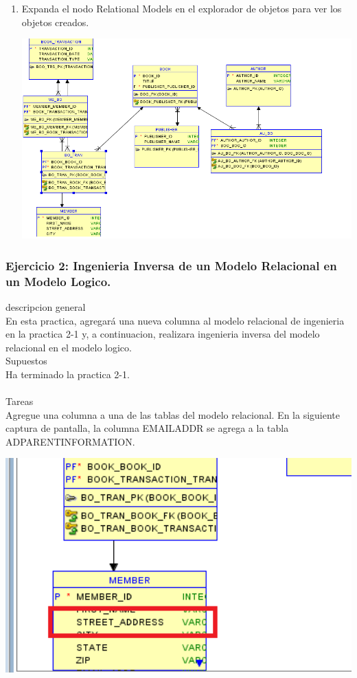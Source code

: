 \documentclass[12pt,letterpaper]{article}
\begin{document}
\begin{enumerate}[1.]
     \item Expanda el nodo Relational Models en el explorador de objetos para ver los objetos creados.
     
          \includegraphics[width=15cm]{./soniaImagen/diagrama5.png}  
          
		\end{enumerate}



\subsubsection{Ejercicio 2: Ingenieria Inversa de un Modelo Relacional en un Modelo Logico.} 
descripcion general  \\
En esta practica, agregará una nueva columna al modelo relacional de ingenieria en la practica 2-1 y, a continuacion, realizara ingenieria inversa del modelo relacional en el modelo logico. \\
Supuestos\\
Ha terminado la practica 2-1.\\
\\
Tareas\\
Agregue una columna a una de las tablas del modelo relacional. En la siguiente captura de pantalla, la columna EMAILADDR se agrega a la tabla ADPARENTINFORMATION.


 \includegraphics[width=15cm]{./soniaImagen/diagrama6.png}  
\end{document}
